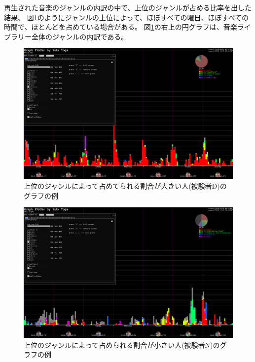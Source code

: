 \documentclass[11pt, onecolumn]{jsarticle}
\begin{document}

再生された音楽のジャンルの内訳の中で、上位のジャンルが占める比率を出した結果、
図\ref{topFive_heavy}のようにジャンルの上位によって、ほぼすべての曜日、ほぼすべての時間で、ほとんどを占めている場合がある。
図\ref{topFive_heavy}の右上の円グラフは、音楽ライブラリー全体のジャンルの内訳である。


\begin{figure}[h]
\begin{center}
\includegraphics[width=14cm]{topFive_heavy.png}
\caption{上位のジャンルによって占めてられる割合が大きい人(被験者D)のグラフの例}
\label{topFive_heavy}
\end{center}
\end{figure}

\begin{figure}[h]
\begin{center}
\includegraphics[width=14cm]{topFive_light.png}
\caption{上位のジャンルによって占められる割合が小さい人(被験者N)のグラフの例}
\label{topFive_light}
\end{center}
\end{figure}
\end{document}
